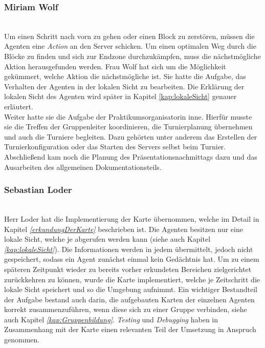 \subsubsection{Miriam Wolf} ~\\
Um einen Schritt nach vorn zu gehen oder einen Block zu zerstören, müssen die Agenten eine \textit{Action} an den Server schicken. Um einen optimalen Weg durch die Blöcke zu finden und sich zur Endzone durchzukämpfen, muss die nächstmögliche Aktion herausgefunden werden. Frau Wolf hat sich um die Möglichkeit gekümmert, welche Aktion die nächstmögliche ist. Sie hatte die Aufgabe, das Verhalten der Agenten in der lokalen Sicht zu bearbeiten. Die Erklärung der lokalen Sicht des Agenten wird später in Kapitel \ref{kap:lokaleSicht} genauer erläutert. \\

Weiter hatte sie die Aufgabe der Praktikumsorganisatorin inne. Hierfür musste sie die Treffen der Gruppenleiter koordinieren, die Turnierplanung übernehmen und auch die Turniere begleiten. Dazu gehörten unter anderem das Erstellen der Turnierkonfiguration oder das Starten des Servers selbst beim Turnier. Abschließend kam noch die Planung des Präsentationsnachmittags dazu und das Ausarbeiten des allgemeinen Dokumentationsteils.

\subsubsection{Sebastian Loder} ~\\
Herr Loder hat die Implementierung der Karte übernommen, welche im Detail in Kapitel \textit{\ref{erkundungDerKarte}} beschrieben ist. Die Agenten besitzen nur eine lokale Sicht, welche je \Percept abgerufen werden kann (siehe auch Kapitel \textit{\ref{kap:lokaleSicht}}). Die Informationen werden in jedem \Step übermittelt, jedoch nicht gespeichert, sodass ein Agent zunächst einmal kein Gedächtnis hat. Um zu einem späteren Zeitpunkt wieder zu bereits vorher erkundeten Bereichen zielgerichtet zurückkehren zu können, wurde die Karte implementiert, welche je Zeitschritt die lokale Sicht speichert und so die Umgebung aufnimmt. Ein wichtiger Bestandteil der Aufgabe bestand auch darin, die aufgebauten Karten der einzelnen Agenten korrekt zusammenzuführen, wenn diese sich zu einer Gruppe verbinden, siehe auch Kapitel \textit{\ref{kap:Gruppenbildung}}. \textit{Testing} und \textit{Debugging} haben in Zusammenhang mit der Karte einen relevanten Teil der Umsetzung in Anspruch genommen.

